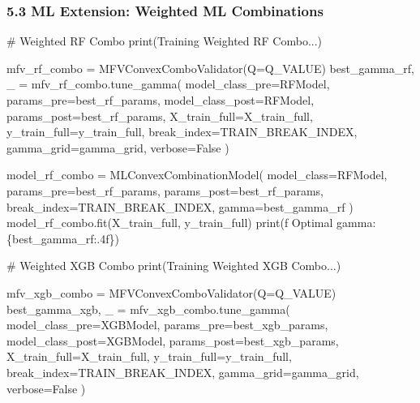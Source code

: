 \documentclass[
  letterpaper,
  DIV=11,
  numbers=noendperiod]{scrartcl}
\newenvironment{Shaded}{\begin{snugshade}}{\end{snugshade}}
\newcommand{\BuiltInTok}[1]{\textcolor[rgb]{0.00,0.23,0.31}{#1}}
\newcommand{\CommentTok}[1]{\textcolor[rgb]{0.37,0.37,0.37}{#1}}
\newcommand{\NormalTok}[1]{\textcolor[rgb]{0.00,0.23,0.31}{#1}}
\newcommand{\OperatorTok}[1]{\textcolor[rgb]{0.37,0.37,0.37}{#1}}
\newcommand{\SpecialCharTok}[1]{\textcolor[rgb]{0.37,0.37,0.37}{#1}}
\newcommand{\SpecialStringTok}[1]{\textcolor[rgb]{0.13,0.47,0.30}{#1}}
\newcommand{\StringTok}[1]{\textcolor[rgb]{0.13,0.47,0.30}{#1}}
\newcommand{\VariableTok}[1]{\textcolor[rgb]{0.07,0.07,0.07}{#1}}
\begin{document}
\subsubsection{5.3 ML Extension: Weighted ML
Combinations}\label{ml-extension-weighted-ml-combinations}

\begin{Shaded}
\begin{Highlighting}[]
\CommentTok{\# Weighted RF Combo}
\BuiltInTok{print}\NormalTok{(}\StringTok{\textquotesingle{}Training Weighted RF Combo...\textquotesingle{}}\NormalTok{)}

\NormalTok{mfv\_rf\_combo }\OperatorTok{=}\NormalTok{ MFVConvexComboValidator(Q}\OperatorTok{=}\NormalTok{Q\_VALUE)}
\NormalTok{best\_gamma\_rf, \_ }\OperatorTok{=}\NormalTok{ mfv\_rf\_combo.tune\_gamma(}
\NormalTok{    model\_class\_pre}\OperatorTok{=}\NormalTok{RFModel, params\_pre}\OperatorTok{=}\NormalTok{best\_rf\_params,}
\NormalTok{    model\_class\_post}\OperatorTok{=}\NormalTok{RFModel, params\_post}\OperatorTok{=}\NormalTok{best\_rf\_params,}
\NormalTok{    X\_train\_full}\OperatorTok{=}\NormalTok{X\_train\_full, y\_train\_full}\OperatorTok{=}\NormalTok{y\_train\_full,}
\NormalTok{    break\_index}\OperatorTok{=}\NormalTok{TRAIN\_BREAK\_INDEX, gamma\_grid}\OperatorTok{=}\NormalTok{gamma\_grid, verbose}\OperatorTok{=}\VariableTok{False}
\NormalTok{)}

\NormalTok{model\_rf\_combo }\OperatorTok{=}\NormalTok{ MLConvexCombinationModel(}
\NormalTok{    model\_class}\OperatorTok{=}\NormalTok{RFModel, params\_pre}\OperatorTok{=}\NormalTok{best\_rf\_params, params\_post}\OperatorTok{=}\NormalTok{best\_rf\_params,}
\NormalTok{    break\_index}\OperatorTok{=}\NormalTok{TRAIN\_BREAK\_INDEX, gamma}\OperatorTok{=}\NormalTok{best\_gamma\_rf}
\NormalTok{)}
\NormalTok{model\_rf\_combo.fit(X\_train\_full, y\_train\_full)}
\BuiltInTok{print}\NormalTok{(}\SpecialStringTok{f\textquotesingle{}  Optimal gamma: }\SpecialCharTok{\{}\NormalTok{best\_gamma\_rf}\SpecialCharTok{:.4f\}}\SpecialStringTok{\textquotesingle{}}\NormalTok{)}

\CommentTok{\# Weighted XGB Combo}
\BuiltInTok{print}\NormalTok{(}\StringTok{\textquotesingle{}Training Weighted XGB Combo...\textquotesingle{}}\NormalTok{)}

\NormalTok{mfv\_xgb\_combo }\OperatorTok{=}\NormalTok{ MFVConvexComboValidator(Q}\OperatorTok{=}\NormalTok{Q\_VALUE)}
\NormalTok{best\_gamma\_xgb, \_ }\OperatorTok{=}\NormalTok{ mfv\_xgb\_combo.tune\_gamma(}
\NormalTok{    model\_class\_pre}\OperatorTok{=}\NormalTok{XGBModel, params\_pre}\OperatorTok{=}\NormalTok{best\_xgb\_params,}
\NormalTok{    model\_class\_post}\OperatorTok{=}\NormalTok{XGBModel, params\_post}\OperatorTok{=}\NormalTok{best\_xgb\_params,}
\NormalTok{    X\_train\_full}\OperatorTok{=}\NormalTok{X\_train\_full, y\_train\_full}\OperatorTok{=}\NormalTok{y\_train\_full,}
\NormalTok{    break\_index}\OperatorTok{=}\NormalTok{TRAIN\_BREAK\_INDEX, gamma\_grid}\OperatorTok{=}\NormalTok{gamma\_grid, verbose}\OperatorTok{=}\VariableTok{False}
\NormalTok{)}


\end{Highlighting}
\end{Shaded}
\end{document}
